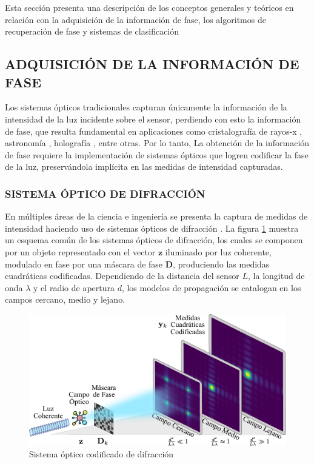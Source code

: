 Esta sección presenta una descripción de los conceptos generales y teóricos en relación con la adquisición de la información de fase, los algoritmos de recuperación de fase y sistemas de clasificación

\subsection{ADQUISICIÓN DE LA INFORMACIÓN DE FASE}

Los sistemas ópticos tradicionales capturan únicamente la información de la intensidad de la luz incidente sobre el sensor, perdiendo con esto la información de fase, que resulta fundamental en aplicaciones como cristalografía de rayos-x \cite{pinilla2018coded}, astronomía \cite{fienup1987phase}, holografía \cite{rivenson2018phase}, entre otras. Por lo tanto, La obtención de la información de  fase  requiere la implementación  de sistemas ópticos que logren codificar la fase de la luz, preservándola implícita en las medidas de intensidad capturadas. 
    
\subsubsection{SISTEMA ÓPTICO DE DIFRACCIÓN}
En múltiples áreas de la ciencia e ingeniería se presenta la captura de medidas de intensidad haciendo uso de sistemas ópticos de difracción \cite{fienup1987phase,pinilla2018coded,rivenson2018phase}. La figura \ref{fig:difraction_systems} muestra un esquema común de los sistemas ópticos de difracción, los cuales se componen por un objeto representado con el vector $\mathbf{z}$ iluminado por luz coherente, modulado en fase por una máscara de fase $\mathbf{D}$, produciendo las medidas cuadráticas codificadas. Dependiendo de la distancia del sensor $L$, la longitud de onda $\lambda$ y el radio de apertura $d$, los modelos de propagación se catalogan en los campos cercano, medio y lejano.

\begin{figure}[H]
    \centering
    \includegraphics[width=\linewidth]{images/DiffractionSystem.pdf}
    \caption{\hspace{2mm}Sistema óptico codificado de difracción}
    \label{fig:difraction_systems}
\end{figure}

